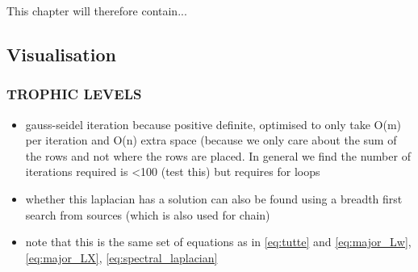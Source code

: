 This chapter will therefore contain...

\subsection{Visualisation}
\label{sec:eco_visualisation}
\subsubsection{TROPHIC LEVELS}
\begin{itemize}
  \item gauss-seidel iteration because positive definite, optimised to only take O(m) per iteration and O(n) extra space (because we only care about the sum of the rows and not where the rows are placed. In general we find the number of iterations required is <100 (test this) but requires for loops
  \item whether this laplacian has a solution can also be found using a breadth first search from sources (which is also used for chain)
  \item note that this is the same set of equations as in \eqref{eq:tutte} and \eqref{eq:major_Lw}, \eqref{eq:major_LX}, \eqref{eq:spectral_laplacian}
\end{itemize}
